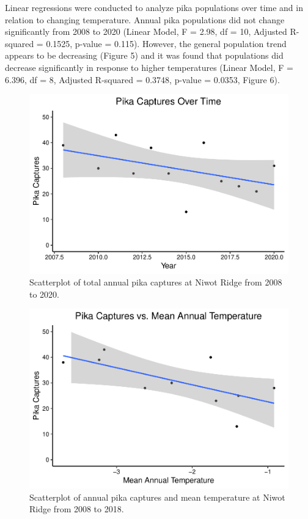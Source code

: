 \documentclass[
  12pt,
]{article}
\begin{document}
Linear regressions were conducted to analyze pika populations over time
and in relation to changing temperature. Annual pika populations did not
change significantly from 2008 to 2020 (Linear Model, F = 2.98, df = 10,
Adjusted R-squared = 0.1525, p-value = 0.115). However, the general
population trend appears to be decreasing (Figure 5) and it was found
that populations did decrease significantly in response to higher
temperatures (Linear Model, F = 6.396, df = 8, Adjusted R-squared =
0.3748, p-value = 0.0353, Figure 6).

\begin{figure}
\centering
\includegraphics{FreedmanDye_ENV872_Project_files/figure-latex/unnamed-chunk-6-1.pdf}
\caption{Scatterplot of total annual pika captures at Niwot Ridge from
2008 to 2020.}
\end{figure}

\begin{figure}
\centering
\includegraphics{FreedmanDye_ENV872_Project_files/figure-latex/unnamed-chunk-7-1.pdf}
\caption{Scatterplot of annual pika captures and mean temperature at
Niwot Ridge from 2008 to 2018.}
\end{figure}
\end{document}
